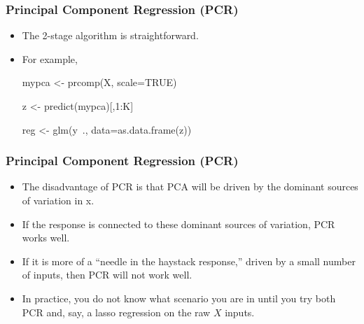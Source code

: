 \documentclass[
  shownotes,
  xcolor={svgnames},
  hyperref={colorlinks,citecolor=DarkBlue,linkcolor=DarkRed,urlcolor=DarkBlue}
  , aspectratio=169]{beamer}
\newcommand{\nv}{\color{Navy}}
\begin{document}
\begin{frame}[fragile]
\frametitle{ Principal Component Regression (PCR)}


\begin{itemize}
 \item The 2-stage algorithm is straightforward. 
 \medskip
 \item For example,
\medskip
{\nv 
\begin{semiverbatim}\vspace{.25cm}\small
         mypca <- prcomp(X, scale=TRUE)

         z <- predict(mypca)[,1:K]

         reg <- glm(y~., data=as.data.frame(z))
\end{semiverbatim}
}

\end{itemize}

\end{frame}
\begin{frame}[fragile]
\frametitle{ Principal Component Regression (PCR)}


\begin{itemize}

  \item The disadvantage of PCR is that PCA will be driven by the dominant sources of variation in x. 
  \medskip
  \item If the response is connected to these dominant sources of variation, PCR works well.
  \medskip
  \item  If it is more of a “needle in the haystack response,” driven by a small number of inputs, then PCR will not work well. 
  \medskip
  \item In practice, you do not know what scenario you are in until you try both PCR and, say, a lasso regression on the raw $X$ inputs.

\end{itemize}


\end{frame}
\end{document}
